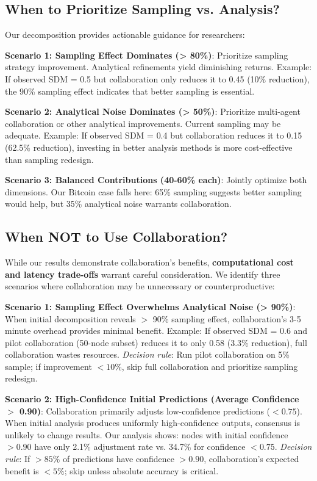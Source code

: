 \documentclass[conference]{IEEEtran}
\begin{document}
\subsection{When to Prioritize Sampling vs. Analysis?}

Our decomposition provides actionable guidance for researchers:

\textbf{Scenario 1: Sampling Effect Dominates (> 80\%)}: Prioritize sampling strategy improvement. Analytical refinements yield diminishing returns. Example: If observed SDM = 0.5 but collaboration only reduces it to 0.45 (10\% reduction), the 90\% sampling effect indicates that better sampling is essential.

\textbf{Scenario 2: Analytical Noise Dominates (> 50\%)}: Prioritize multi-agent collaboration or other analytical improvements. Current sampling may be adequate. Example: If observed SDM = 0.4 but collaboration reduces it to 0.15 (62.5\% reduction), investing in better analysis methods is more cost-effective than sampling redesign.

\textbf{Scenario 3: Balanced Contributions (40-60\% each)}: Jointly optimize both dimensions. Our Bitcoin case falls here: 65\% sampling suggests better sampling would help, but 35\% analytical noise warrants collaboration.

\subsection{When NOT to Use Collaboration?}

While our results demonstrate collaboration's benefits, \textbf{computational cost and latency trade-offs} warrant careful consideration. We identify three scenarios where collaboration may be unnecessary or counterproductive:

\textbf{Scenario 1: Sampling Effect Overwhelms Analytical Noise (> 90\%)}: When initial decomposition reveals $>$ 90\% sampling effect, collaboration's 3-5 minute overhead provides minimal benefit. Example: If observed SDM = 0.6 and pilot collaboration (50-node subset) reduces it to only 0.58 (3.3\% reduction), full collaboration wastes resources. \textit{Decision rule}: Run pilot collaboration on 5\% sample; if improvement $< 10\%$, skip full collaboration and prioritize sampling redesign.

\textbf{Scenario 2: High-Confidence Initial Predictions (Average Confidence $>$ 0.90)}: Collaboration primarily adjusts low-confidence predictions ($< 0.75$). When initial analysis produces uniformly high-confidence outputs, consensus is unlikely to change results. Our analysis shows: nodes with initial confidence $> 0.90$ have only 2.1\% adjustment rate vs. 34.7\% for confidence $< 0.75$. \textit{Decision rule}: If $> 85\%$ of predictions have confidence $> 0.90$, collaboration's expected benefit is $< 5\%$; skip unless absolute accuracy is critical.
\end{document}
